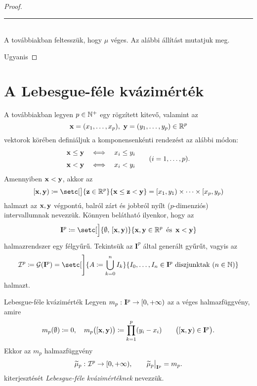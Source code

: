 \documentclass[
]{elteikthesis}[2024/04/26]
\begin{document}
\begin{proof}
		\noindent\rule{\linewidth}{0.4pt}\\
		
		A továbbiakban feltesszük, hogy \( \mu \) véges. Az alábbi állítást mutatjuk meg.
		
		\fbox{\ref{eq:kvázimérték-jellemzése-04} \( \Longrightarrow \)
			  \ref{eq:kvázimérték-jellemzése-02}}
		Ugyanis
		
	\end{proof}
	
	\newpage
	\section{A Lebesgue-féle kvázimérték}
	
	A továbbiakban legyen \( p \in \mathbb{N}^+ \) egy rögzített kitevő, valamint az
	\[
		\vb{x} = (x_1, \dots, x_p), \ \vb{y} = (y_1, \dots, y_p) \in \mathbb{R}^p
	\]
	vektorok körében definiáljuk a komponensenkénti rendezést az alábbi módon:
	\[
		\begin{alignedat}{3}
			\x &\leq \y \quad &&\ratio \Longleftrightarrow \quad x_i &&\leq y_i \\[3pt]
			\x &<    \y \quad &&\ratio \Longleftrightarrow \quad x_i &&<    y_i
		\end{alignedat}
		\qquad (i = 1,\dots, p).
	\]
	Amennyiben \( \vb{x} < \vb{y} \), akkor az
	\[
		[\x, \y) \coloneq 
		\setc[\big]{ \vb{z} \in \R^p }{ \x \leq \vb{z} < \y } =
		[ x_1, y_1 ) \times \cdots \times [x_p, y_p )
	\]
	halmazt az \( \vb{x}, \vb{y} \) végpontú, balról zárt és jobbról nyílt (\( p \)-dimenziós) intervallumnak nevezzük. Könnyen belátható ilyenkor, hogy az
	\[
		\mathbf{I}^p \coloneq 
		\setc[\Big]{ \emptyset,\, [\x, \y) }{ \x, \y \in \R^p \,\text{ és }\, \x < \y }
	\]
	halmazrendszer egy félgyűrű. Tekintsük az \( \mathbf{I}^p \) által generált gyűrűt, vagyis az
	\[
		\mathcal{I}^p \coloneq 
		\mathcal{G}( \mathbf{I}^p ) =
		\setc[\Bigg]{ A \coloneq \bigcup_{k=0}^n I_k }
					{ I_0, \dots, I_n \in \mathbf{I}^p \text{ diszjunktak } (n \in \N) }
	\]
	halmazt.
	
	\begin{definition}{Lebesgue-féle kvázimérték}{}
		Legyen \( m_p  \,\colon  \mathbf{I}^p  \to [0, +\infty) \) az a véges halmazfüggvény, amire
		\[
			m_p( \emptyset ) \coloneq 0, \quad
			m_p \bigl( [\vb{x}, \vb{y}) \bigr) \coloneq \prod_{k=1}^{p} (y_i - x_i) 
			\qquad \bigl( [\vb{x}, \vb{y}) \in \mathbf{I}^p \bigr).
		\]
		Ekkor az \( m_p \) halmazfüggvény
		\[
			\func{ \widetilde{\mu}_p }{ \mathcal{I}^p }{[0, +\infty)}, \qquad
			\restr{ \widetilde{\mu}_p }{ \mathbf{I}^p } = m_p.
		\]
		kiterjesztését \emph{Lebesgue-féle kvázimértéknek} nevezzük.
	\end{definition}
	
\end{document}
